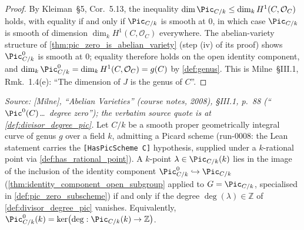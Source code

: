 \begin{proof}
  By Kleiman~\S 5,
  Cor.~5.13, the inequality
  \(\dim \Pic_{C/k} \le \dim_k H^1(C, \mathcal{O}_C)\) holds, with
  equality if and only if \(\Pic_{C/k}\) is smooth at \(0\), in which
  case \(\Pic_{C/k}\) is smooth of dimension \(\dim_k H^1(C,
  \mathcal{O}_C)\) everywhere. The abelian-variety structure of
  \cref{thm:pic_zero_is_abelian_variety} (step (iv) of its proof)
  shows \(\Pic^0_{C/k}\) is smooth at \(0\); equality therefore holds
  on the open identity component, and
  \(\dim_k \Pic^0_{C/k} = \dim_k H^1(C, \mathcal{O}_C) = g(C)\)
  by \cref{def:genus}. This is Milne~\S III.1, Rmk.~1.4(e): ``The
  dimension of \(J\) is the genus of \(C\)''.
\end{proof}

\begin{theorem}

  \label{thm:pic_zero_k_points_iff_degree_zero}

  \textit{Source: [Milne], ``Abelian Varieties'' (course notes, 2008),
  \S III.1, p.~88 (``\(\Pic^0(C)\)\dots\ degree zero''); the verbatim
  source quote is at \cref{def:divisor_degree_pic}.}
  Let \(C/k\) be a smooth proper geometrically integral curve of genus
  \(g\) over a field \(k\), admitting a Picard scheme (run-0008: the Lean
  statement carries the \texttt{[HasPicScheme C]} hypothesis, supplied
  under a \(k\)-rational point via \cref{def:has_rational_point}). A
  \(k\)-point
  \(\lambda \in \Pic_{C/k}(k)\) lies in the image of the inclusion of
  the identity component \(\Pic^0_{C/k} \hookrightarrow \Pic_{C/k}\)
  (\cref{thm:identity_component_open_subgroup} applied to
  \(G = \Pic_{C/k}\), specialised in \cref{def:pic_zero_subscheme})
  if and only if the degree
  \(\deg(\lambda) \in \mathbb{Z}\) of \cref{def:divisor_degree_pic}
  vanishes. Equivalently,
  \(\Pic^0_{C/k}(k) = \ker\bigl(\deg : \Pic_{C/k}(k) \to \mathbb{Z}\bigr)\).
\end{theorem}

